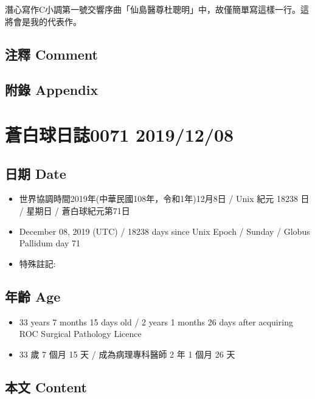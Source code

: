 \documentclass[a5paper, 12pt
]{book}
\providecommand{\tightlist}{%
  \setlength{\itemsep}{0pt}\setlength{\parskip}{0pt}}
\begin{document}
潛心寫作C小調第一號交響序曲「仙島醫尊杜聰明」中，故僅簡單寫這樣一行。這將會是我的代表作。

\hypertarget{ux6ce8ux91cb-comment-6}{%
\subsection{注釋 Comment}\label{ux6ce8ux91cb-comment-6}}

\hypertarget{ux9644ux9304-appendix-6}{%
\subsection{附錄 Appendix}\label{ux9644ux9304-appendix-6}}

\hypertarget{ux84bcux767dux7403ux65e5ux8a8c0071-20191208}{%
\section{蒼白球日誌0071
2019/12/08}\label{ux84bcux767dux7403ux65e5ux8a8c0071-20191208}}

\hypertarget{ux65e5ux671f-date-7}{%
\subsection{日期 Date}\label{ux65e5ux671f-date-7}}

\begin{itemize}
\tightlist
\item
  世界協調時間2019年(中華民國108年，令和1年)12月8日 / Unix 紀元 18238 日
  / 星期日 / 蒼白球紀元第71日
\item
  December 08, 2019 (UTC) / 18238 days since Unix Epoch / Sunday /
  Globus Pallidum day 71
\item
  特殊註記:
\end{itemize}

\hypertarget{ux5e74ux9f61-age-7}{%
\subsection{年齡 Age}\label{ux5e74ux9f61-age-7}}

\begin{itemize}
\tightlist
\item
  33 years 7 months 15 days old / 2 years 1 months 26 days after
  acquiring ROC Surgical Pathology Licence
\item
  33 歲 7 個月 15 天 / 成為病理專科醫師 2 年 1 個月 26 天
\end{itemize}

\hypertarget{ux672cux6587-content-7}{%
\subsection{本文 Content}\label{ux672cux6587-content-7}}
\end{document}
